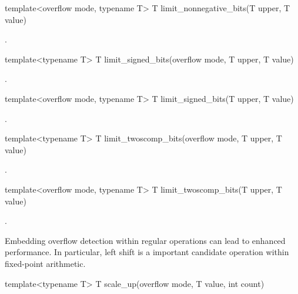 \begin{itemdecl}
template<overflow mode, typename T> T limit_nonnegative_bits(T upper, T value)		
\end{itemdecl}

\begin{itemdescr}
\returns {}.	
\end{itemdescr}

\begin{itemdecl}
template<typename T> T limit_signed_bits(overflow mode, T upper, T value)		
\end{itemdecl}

\begin{itemdescr}
\returns {}.	
\end{itemdescr}

\begin{itemdecl}
template<overflow mode, typename T> T limit_signed_bits(T upper, T value)		
\end{itemdecl}

\begin{itemdescr}
\returns {}.
\end{itemdescr}

\begin{itemdecl}
template<typename T> T limit_twoscomp_bits(overflow mode, T upper, T value)		
\end{itemdecl}

\begin{itemdescr}
\returns {}.	
\end{itemdescr}

\begin{itemdecl}
template<overflow mode, typename T> T limit_twoscomp_bits(T upper, T value)		
\end{itemdecl}

\begin{itemdescr}
\returns {}.	
\end{itemdescr}

Embedding overflow detection within regular operations can lead to enhanced performance. In particular, left shift is a important candidate operation within fixed-point arithmetic.

\begin{itemdecl}
template<typename T> T scale_up(overflow mode, T value, int count)		
\end{itemdecl}

